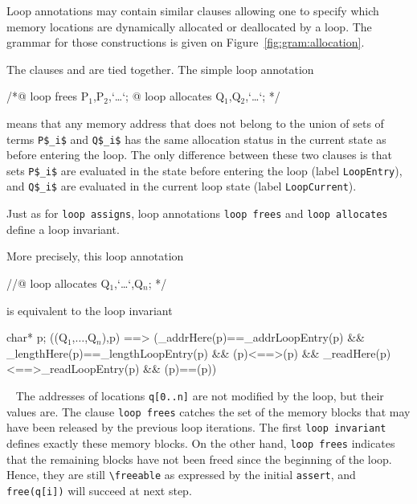 Loop annotations may contain similar clauses allowing one to specify which 
memory locations 
are dynamically allocated or deallocated by a loop.
The grammar for those constructions is given on
 Figure~\ref{fig:gram:allocation}.

The clauses \Loop \allocates and \Loop \frees are tied together.
The simple loop annotation
\begin{listing-nonumber}
/*@ loop frees P$_1$,P$_2$,`\dots`;
  @ loop allocates Q$_1$,Q$_2$,`\dots`; */
\end{listing-nonumber}
means that any memory address that does not belong to the union of sets of 
terms
\lstinline|P$_i$| and  \lstinline|Q$_i$|
has the same allocation status in the current state as 
before entering the loop. 
The only difference between these two clauses is that sets 
\lstinline|P$_i$| are evaluated in the state before entering the loop
(label \lstinline|LoopEntry|), 
and \lstinline|Q$_i$| are evaluated in the current loop state 
(label \lstinline|LoopCurrent|).

Just as for \lstinline|loop assigns|, loop annotations
\lstinline|loop frees| and \lstinline|loop allocates| define a loop invariant.

More precisely, this loop annotation
\begin{listing-nonumber}
//@ loop allocates Q$_1$,`\dots`,Q$_n$; */
\end{listing-nonumber}
is equivalent to the loop invariant
\begin{listing-nonumber}
\forall char* p; 
\separated(\union(Q$_1$,$\ldots$,Q$_n$),p) ==>
   (\base_addr{Here}(p)==\base_addr{LoopEntry}(p)
    && \block_length{Here}(p)==\block_length{LoopEntry}(p)
    && (p)<==>(p)
    && \valid_read{Here}(p)<==>\valid_read{LoopEntry}(p)
    && (p)==(p))
\end{listing-nonumber}

\begin{example}
~
The addresses of locations \lstinline|q[0..n]| are not modified by the loop,
but their values are.
The clause \lstinline|loop frees| catches the set of the memory blocks 
that may have been released by the previous loop iterations.
The first \lstinline|loop invariant| defines exactly these memory blocks.
On the other hand, \lstinline|loop frees| indicates that the remaining blocks
have not been freed since the beginning of the loop. Hence, they are still
\lstinline|\freeable| as expressed by the initial \lstinline|assert|, and
\lstinline|free(q[i])| will succeed at next step.
\end{example}


